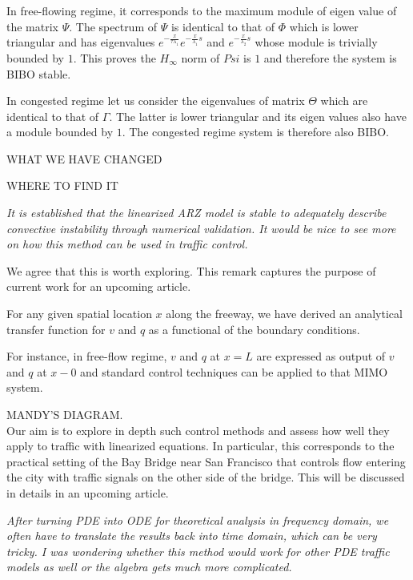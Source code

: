 \documentclass{article}
\begin{document}
In free-flowing regime, it corresponds to the maximum module of eigen value of the matrix $\Psi$. The spectrum of $\Psi$ is identical to that of $\Phi$ which is lower triangular and has eigenvalues 
$
e^{ - \frac{x}{\tau \lambda_1}}
e^{ - \frac{x}{\lambda_1} s}
$
and
$
e^{ - \frac{x}{\lambda_2} s}
$
whose module is trivially bounded by $1$.
This proves the $H_{\infty}$ norm of $Psi$ is $1$ and therefore the system is BIBO stable.

In congested regime let us consider the eigenvalues of matrix $\Theta$ which are identical to that of $\Gamma$.
The latter is lower triangular and its eigen values also have a module bounded by $1$.
The congested regime system is therefore also BIBO.

WHAT WE HAVE CHANGED

WHERE TO FIND IT

\emph{
It is established that the linearized ARZ model is stable to adequately describe convective instability through numerical validation. It would be nice to see more on how this method can be used in traffic control.
}

We agree that this is worth exploring. This remark captures the purpose of current work for an upcoming article.

For any given spatial location $x$ along the freeway, we have derived an analytical transfer function for $v$ and $q$ as a functional of the boundary conditions.

For instance, in free-flow regime, $v$ and $q$ at $x = L$ are expressed as output of $v$ and $q$ at $x - 0$ and standard control techniques can be applied to that MIMO system.

MANDY'S DIAGRAM.\\

Our aim is to explore in depth such control methods and assess how well they apply to traffic with linearized equations. In particular, this corresponds to the practical setting of the Bay Bridge near San Francisco that controls flow entering the city with traffic signals on the other side of the bridge. This will be discussed in details in an upcoming article.

\bigskip{}

\emph{
After turning PDE into ODE for theoretical analysis in frequency domain, we often have to translate the results back into time domain, which can be very tricky. I was wondering whether this method would work for other PDE traffic models as well or the algebra gets much more complicated.
}
\end{document}
